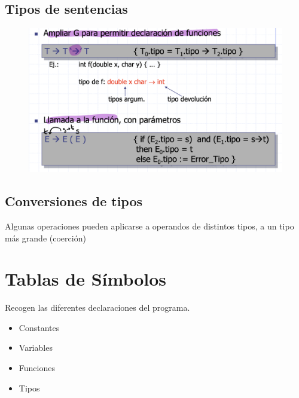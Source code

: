 \documentclass[12pt, twoside, openright]{report} %
\begin{document}
\subsection{Tipos de sentencias}
\begin{figure}[H]
  {\includegraphics[scale=.3]{Screenshot 2021-06-09 at 12.26.53.png}}
\end{figure}

\subsection{Conversiones de tipos}
Algunas operaciones pueden aplicarse a operandos de distintos tipos, a un tipo más grande  (coerción)

\section{Tablas de Símbolos}
Recogen las diferentes declaraciones del programa.
\begin{itemize}
  \item Constantes
  \item Variables
  \item Funciones
  \item Tipos
\end{itemize}
\end{document}
